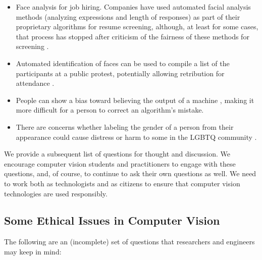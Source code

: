 \begin{itemize}
  \item Face analysis for job hiring.  Companies have used automated facial analysis methods (analyzing expressions and length of responses) as part of their proprietary algorithms for resume screening, although, at least for some cases, that process has stopped after criticism of the fairness of these methods for screening \cite{Kahn2021}.
  \item Automated identification of faces can be used to compile a list of the participants at a public protest, potentially allowing retribution for attendance
        \cite{Garvie2016,Mozur2019}.
  \item People can show a bias toward believing the output of a machine \cite{Cummings2004}, making it more difficult for a person to correct an algorithm's mistake.

  \item There are concerns whether labeling the gender of a person from their appearance could cause distress or harm to some in the LGBTQ community \cite{Hamidi2018,Bennett2021}.
\end{itemize}

We provide a subsequent list of
questions for thought and discussion.  We encourage computer vision students and
practitioners to engage with these questions, and, of course, to continue to ask their own questions as well.  We need to work both as technologists and as citizens to ensure that computer vision technologies are used responsibly.


\subsection{Some Ethical Issues in Computer Vision}

The following are an (incomplete) set of questions that researchers and engineers may keep in mind:

